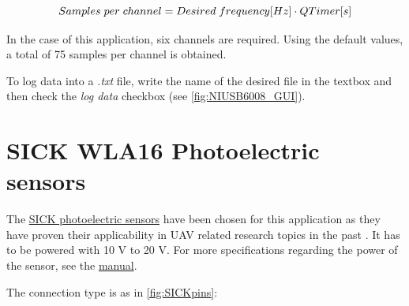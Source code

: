 \documentclass[a4paper]{article}
\begin{document}
\begin{equation}
	Samples\hspace{1mm}per\hspace{1mm}channel = Desired\hspace{1mm}frequency[Hz] \cdot QTimer[s]
\end{equation}

In the case of this application, six channels are required. Using the default values, a total of 75 samples per channel is obtained.

To log data into a \textit{.txt} file, write the name of the desired file in the textbox and then check the \textit{log data} checkbox (see \autoref{fig:NIUSB6008_GUI}).





\section{SICK WLA16 Photoelectric sensors}

The \hyperref{https://www.sick.com/us/en/photoelectric-sensors/photoelectric-sensors/w16/wla16p-24162100a00/p/p512654}{sensors}{SICK}{SICK photoelectric sensors} have been chosen for this application as they have proven their applicability in UAV related research topics in the past \cite{Scanavino2021}. It has to be powered with 10 V to 20 V. For more specifications regarding the power of the sensor, see the \hyperref{https://cdn.sick.com/media/pdf/4/54/654/dataSheet_WLA16P-24162100A00_1218660_en.pdf}{category}{name}{manual}.

The connection type is as in \autoref{fig:SICKpins}:
\end{document}
